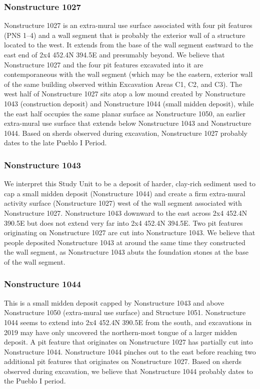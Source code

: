 \documentclass[
  12pt,
]{krantz}
\begin{document}
\hypertarget{nonstructure-1027}{%
\subsubsection{Nonstructure 1027}\label{nonstructure-1027}}

Nonstructure 1027 is an extra-mural use surface associated with four pit
features (PNS 1--4) and a wall segment that is probably the exterior
wall of a structure located to the west. It extends from the base of the
wall segment eastward to the east end of 2x4 452.4N 394.5E and
presumably beyond. We believe that Nonstructure 1027 and the four pit
features excavated into it are contemporaneous with the wall segment
(which may be the eastern, exterior wall of the same building observed
within Excavation Areas C1, C2, and C3). The west half of Nonstructure
1027 sits atop a low mound created by Nonstructure 1043 (construction
deposit) and Nonstructure 1044 (small midden deposit), while the east
half occupies the same planar surface as Nonstructure 1050, an earlier
extra-mural use surface that extends below Nonstructure 1043 and
Nonstructure 1044. Based on sherds observed during excavation,
Nonstructure 1027 probably dates to the late Pueblo I Period.

\hypertarget{nonstructure-1043}{%
\subsubsection{Nonstructure 1043}\label{nonstructure-1043}}

We interpret this Study Unit to be a deposit of harder, clay-rich
sediment used to cap a small midden deposit (Nonstructure 1044) and
create a firm extra-mural activity surface (Nonstructure 1027) west of
the wall segment associated with Nonstructure 1027. Nonstructure 1043
downward to the east across 2x4 452.4N 390.5E but does not extend very
far into 2x4 452.4N 394.5E. Two pit features originating on Nonstructure
1027 are cut into Nonstructure 1043. We believe that people deposited
Nonstructure 1043 at around the same time they constructed the wall
segment, as Nonstructure 1043 abuts the foundation stones at the base of
the wall segment.

\hypertarget{nonstructure-1044}{%
\subsubsection{Nonstructure 1044}\label{nonstructure-1044}}

This is a small midden deposit capped by Nonstructure 1043 and above
Nonstructure 1050 (extra-mural use surface) and Structure 1051.
Nonstructure 1044 seems to extend into 2x4 452.4N 390.5E from the south,
and excavations in 2019 may have only uncovered the northern-most tongue
of a larger midden deposit. A pit feature that originates on
Nonstructure 1027 has partially cut into Nonstructure 1044. Nonstructure
1044 pinches out to the east before reaching two additional pit features
that originates on Nonstructure 1027. Based on sherds observed during
excavation, we believe that Nonstructure 1044 probably dates to the
Pueblo I period.
\end{document}
